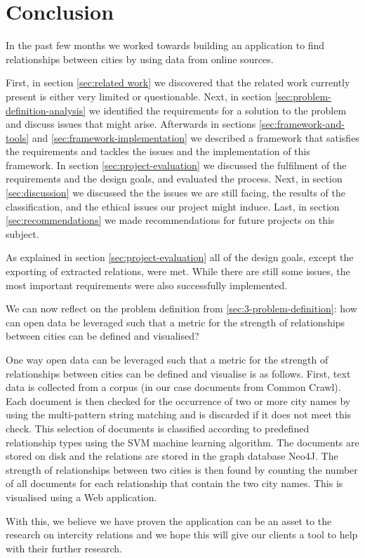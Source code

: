 \chapter{Conclusion}
In the past few months we worked towards building an application to find relationships between cities by using data from online sources.

First, in section \ref{sec:related work} we discovered that the related work currently present is either very limited or questionable. Next, in section \ref{sec:problem-definition-analysis} we identified the requirements for a solution to the problem and discuss issues that might arise. Afterwards in sections \ref{sec:framework-and-tools} and \ref{sec:framework-implementation} we described a framework that satisfies the requirements and tackles the issues and the implementation of this framework. In section \ref{sec:project-evaluation} we discussed the fulfilment of the requirements and the design goals, and evaluated the process. Next, in section \ref{sec:discussion} we discussed the the issues we are still facing, the results of the classification, and the ethical issues our project might induce. Last, in section \ref{sec:recommendations} we made recommendations for future projects on this subject.

As explained in section \ref{sec:project-evaluation} all of the design goals, except the exporting of extracted relations, were met. While there are still some issues, the most important requirements were also successfully implemented.

We can now reflect on the problem definition from \ref{sec:3-problem-definition}: how can open data be leveraged such that a metric for the strength of relationships between cities can be defined and visualised?

One way open data can be leveraged such that a metric for the strength of relationships between cities can be defined and visualise is as follows. First, text data is collected from a corpus (in our case documents from Common Crawl). Each document is then checked for the occurrence of two or more city names by using the multi-pattern string matching and is discarded if it does not meet this check. This selection of documents is classified according to predefined relationship types using the SVM machine learning algorithm. The documents are stored on disk and the relations are stored in the graph database Neo4J. The strength of relationships between two cities is then found by counting the number of all documents for each relationship that contain the two city names. This is visualised using a Web application.

With this, we believe we have proven the application can be an asset to the research on intercity relations and we hope this will give our clients a tool to help with their further research. 
